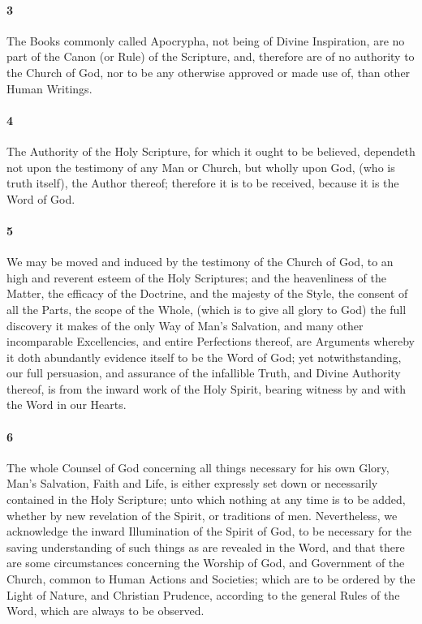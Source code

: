 \documentclass[
    paper=letterpaper,
    11pt,
    twoside,
    DIV=calc,
    openany
]{scrbook}
\begin{document}
\footnotebegin
{}
\footnoteend
      
\paragraph{3} %
The Books commonly called Apocrypha, not being of \R{}Divine Inspiration, are no part of the Canon (or Rule) of the Scripture, and, therefore are of no authority to the Church of God, nor to be any otherwise approved or made use of, than other Human Writings. 

\footnotebegin
{}
\footnoteend

\paragraph{4} %
The Authority of the Holy Scripture, for which it ought to be believed, dependeth not upon the testimony of any Man or Church, but wholly upon \R{}God, (who is truth itself), the Author thereof; therefore it is to be received, because it is the Word of God.

\footnotebegin
{}
\footnoteend

\paragraph{5} %
We may be moved and induced by the testimony of the Church of God, to an high and reverent esteem of the Holy Scriptures; and the heavenliness of the Matter, the efficacy of the Doctrine, and the majesty of the Style, the consent of all the Parts, the scope of the Whole, (which is to give all glory to God) the full discovery it makes of the only Way of Man’s Salvation, and many other incomparable Excellencies, and entire Perfections thereof, are Arguments whereby it doth abundantly evidence itself to be the Word of God; yet notwithstanding, our \R{}full persuasion, and assurance of the infallible Truth, and Divine Authority thereof, is from the inward work of the Holy Spirit, bearing witness by and with the Word in our Hearts.

\footnotebegin
{}
\footnoteend

\paragraph{6} %
The whole Counsel of God concerning all things \R{}necessary for his own Glory, Man’s Salvation, Faith and Life, is either expressly set down or necessarily contained in the Holy Scripture; unto which nothing at any time is to be added, whether by new revelation of the Spirit, or traditions of men. 
Nevertheless, we acknowledge the inward \R{}Illumination of the Spirit of God, to be necessary for the saving understanding of such things as are revealed in the Word, and that there are some circumstances concerning the Worship of God, and Government of the Church, common to Human Actions and Societies; which are to be \R{}ordered by the Light of Nature, and Christian Prudence, according to the general Rules of the Word, which are always to be observed.
\end{document}
